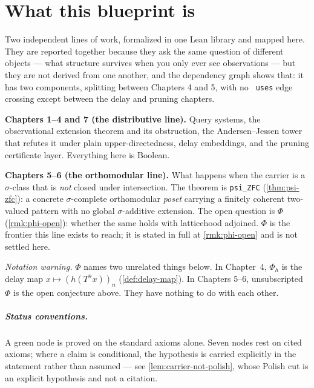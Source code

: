 
\chapter*{What this blueprint is}

Two independent lines of work, formalized in one Lean library and mapped here.
They are reported together because they ask the same question of different
objects --- what structure survives when you only ever see observations --- but
they are not derived from one another, and the dependency graph shows that: it
has two components, splitting between Chapters 4 and 5, with no
\texttt{ uses} edge crossing except between the delay and pruning
chapters.

\textbf{Chapters 1--4 and 7 (the distributive line).} Query systems, the
observational extension theorem and its obstruction, the Andersen--Jessen
tower that refutes it under plain upper-directedness, delay embeddings, and the
pruning certificate layer. Everything here is Boolean.

\textbf{Chapters 5--6 (the orthomodular line).} What happens when the carrier
is a $\sigma$-class that is \emph{not} closed under intersection. The
theorem is \texttt{psi\_ZFC} (\ref{thm:psi-zfc}): a concrete $\sigma$-complete
orthomodular \emph{poset} carrying a finitely coherent two-valued pattern with
no global $\sigma$-additive extension. The open question is
$\Phi$ (\ref{rmk:phi-open}): whether the same holds with latticehood adjoined.
$\Phi$ is the frontier this line exists to reach; it is stated in full at
\ref{rmk:phi-open} and is not settled here.

\emph{Notation warning.} $\Phi$ names two unrelated things below. In
Chapter~4, $\Phi_h$ is the delay map $x \mapsto (h(T^n x))_n$
(\ref{def:delay-map}). In Chapters 5--6, unsubscripted $\Phi$ is the open
conjecture above. They have nothing to do with each other.

\paragraph{Status conventions.} A green node is proved on the standard axioms
alone. Seven nodes rest on cited axioms; where a claim is conditional, the
hypothesis is carried explicitly in the statement rather than assumed --- see
\ref{lem:carrier-not-polish}, whose Polish cut is an explicit hypothesis and
not a citation.

